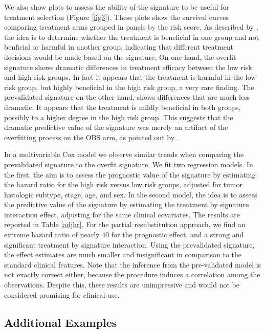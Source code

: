\documentclass[12pt,]{article}
\begin{document}
We also show plots to assess the ability of the signature to be useful
for treatment selection (Figure \ref{fig3}). These plots show the
survival curves comparing treatment arms grouped in panels by the risk
score. As described by \citet{polley2013statistical}, the idea is to
determine whether the treatment is beneficial in one group and not
benficial or harmful in another group, indicating that different
treatment decisions would be made based on the signature. On one hand,
the overfit signature shows dramatic differences in treatment efficacy
between the low risk and high risk groups. In fact it appears that the
treatment is harmful in the low risk group, but highly beneficial in the
high risk group, a very rare finding. The prevalidated signature on the
other hand, shows differences that are much less dramatic. It appears
that the treatment is mildly beneficial in both groups, possibly to a
higher degree in the high risk group. This suggests that the dramatic
predictive value of the signature was merely an artifact of the
overfitting process on the OBS arm, as pointed out by
\citet{simon2011re}.

In a multivariable Cox model we observe similar trends when comparing
the prevalidated signature to the overfit signature. We fit two
regression models. In the first, the aim is to assess the prognostic
value of the signature by estimating the hazard ratio for the high risk
versus low risk groups, adjusted for tumor histologic subtype, stage,
age, and sex. In the second model, the idea is to assess the predictive
value of the signature by estimating the treatment by signature
interaction effect, adjusting for the same clinical covariates. The
results are reported in Table \ref{adjhr}. For the partial
resubstitution approach, we find an extreme hazard ratio of nearly 40
for the prognostic effect, and a strong and significant treatment by
signature interaction. Using the prevalidated signature, the effect
estimates are much smaller and insignificant in comparison to the
standard clinical features. Note that the inference from the
pre-validated model is not exactly correct either, because the procedure
induces a correlation among the observations. Despite this, these
results are unimpressive and would not be considered promising for
clinical use.

\subsection{Additional Examples}\label{additional-examples}
\end{document}
